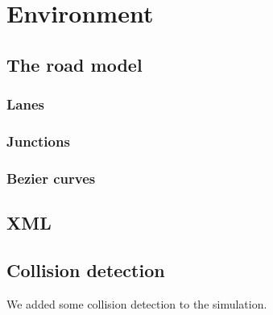 
\section{Environment}
\label{sec:environment}

\subsection{The road model}
\label{sec:roadModel}

\subsubsection{Lanes}
\label{sec:lanes}

\subsubsection{Junctions}
\label{sec:junctions}


\subsubsection{Bezier curves}


\subsection{XML}
\label{sec:XML}


\subsection{Collision detection}

We added some collision detection to the simulation.
